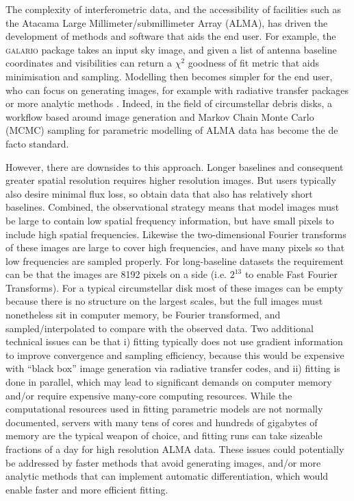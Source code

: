 \documentclass[fleqn,usenatbib]{mnras}
\begin{document}
The complexity of interferometric data, and the accessibility of facilities such as the Atacama Large Millimeter/submillimeter Array (ALMA), has driven the development of methods and software that aids the end user. For example, the \textsc{galario} package \citep{2018MNRAS.476.4527T} takes an input sky image, and given a list of antenna baseline coordinates and visibilities can return a $\chi^2$ goodness of fit metric that aids minimisation and sampling. Modelling then becomes simpler for the end user, who can focus on generating images, for example with radiative transfer packages \citep[e.g. RADMC,][]{2012ascl.soft02015D} or more analytic methods \citep[e.g.][]{2021MNRAS.504.4497C}. Indeed, in the field of circumstellar debris disks, a workflow based around image generation and Markov Chain Monte Carlo (MCMC) sampling for parametric modelling of ALMA data has become the de facto standard.

However, there are downsides to this approach. Longer  baselines and consequent greater spatial resolution requires higher resolution images. But users typically also desire minimal flux loss, so obtain data that also has relatively short baselines.  Combined, the observational strategy means that model images must be large to contain low spatial frequency information, but have small pixels to include high spatial frequencies. Likewise the two-dimensional Fourier transforms of these images are large to cover high frequencies, and have many pixels so that low frequencies are sampled properly. For long-baseline datasets the requirement can be that the images are 8192 pixels on a side (i.e. $2^{13}$ to enable Fast Fourier Transforms). For a typical circumstellar disk most of these images can be empty because there is no structure on the largest scales, but the full images must nonetheless sit in computer memory, be Fourier transformed, and sampled/interpolated to compare with the observed data. Two additional technical issues can be that i) fitting typically does not use gradient information to improve convergence and sampling efficiency, because this would be expensive with ``black box'' image generation via radiative transfer codes, and ii) fitting is done in parallel, which may lead to significant demands on computer memory and/or require expensive many-core computing resources. While the computational resources used in fitting parametric models are not normally documented, servers with many tens of cores and hundreds of gigabytes of memory are the typical weapon of choice, and fitting runs can take sizeable fractions of a day for high resolution ALMA data. These issues could potentially be addressed by faster methods that avoid generating images, and/or more analytic methods that can implement automatic differentiation, which would enable faster and more efficient fitting.
\end{document}
